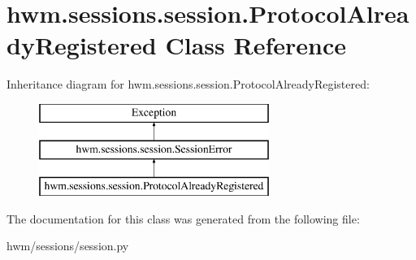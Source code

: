 \hypertarget{classhwm_1_1sessions_1_1session_1_1_protocol_already_registered}{\section{hwm.\-sessions.\-session.\-Protocol\-Already\-Registered Class Reference}
\label{classhwm_1_1sessions_1_1session_1_1_protocol_already_registered}
}
Inheritance diagram for hwm.\-sessions.\-session.\-Protocol\-Already\-Registered\-:\begin{figure}[H]
\begin{center}
\leavevmode
\includegraphics[height=3.000000cm]{classhwm_1_1sessions_1_1session_1_1_protocol_already_registered}
\end{center}
\end{figure}


The documentation for this class was generated from the following file\-:\begin{DoxyCompactItemize}
\item 
hwm/sessions/session.\-py\end{DoxyCompactItemize}
